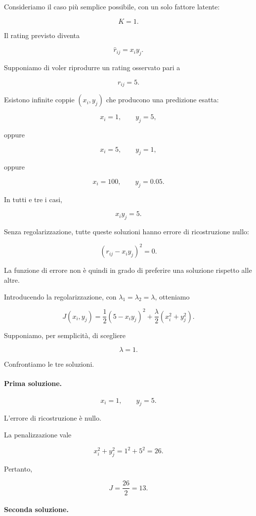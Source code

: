 Consideriamo il caso più semplice possibile,
con un solo fattore latente:

\[
K=1.
\]

Il rating previsto diventa

\[
\widehat r_{ij}=x_i y_j.
\]

Supponiamo di voler riprodurre un rating osservato
pari a

\[
r_{ij}=5.
\]

Esistono infinite coppie $(x_i,y_j)$ che producono
una predizione esatta:

\[
x_i=1,
\qquad
y_j=5,
\]

oppure

\[
x_i=5,
\qquad
y_j=1,
\]

oppure

\[
x_i=100,
\qquad
y_j=0.05.
\]

In tutti e tre i casi,

\[
x_i y_j=5.
\]

Senza regolarizzazione, tutte queste soluzioni
hanno errore di ricostruzione nullo:

\[
(r_{ij}-x_i y_j)^2=0.
\]

La funzione di errore non è quindi in grado di preferire
una soluzione rispetto alle altre.

Introducendo la regolarizzazione, con
$\lambda_1=\lambda_2=\lambda$, otteniamo

\[
J(x_i,y_j)
=
\frac{1}{2}(5-x_i y_j)^2
+
\frac{\lambda}{2}(x_i^2+y_j^2).
\]

Supponiamo, per semplicità, di scegliere

\[
\lambda=1.
\]

Confrontiamo le tre soluzioni.

\paragraph{Prima soluzione.}

\[
x_i=1,
\qquad
y_j=5.
\]

L'errore di ricostruzione è nullo.

La penalizzazione vale

\[
x_i^2+y_j^2
=
1^2+5^2
=
26.
\]

Pertanto,

\[
J=\frac{26}{2}=13.
\]

\paragraph{Seconda soluzione.}

